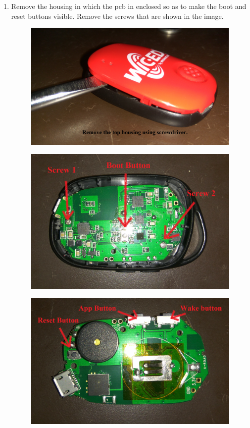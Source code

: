 \documentclass[11pt,a4paper]{article}
\begin{document}
\begin{enumerate}
	  \newpage
	  \item Remove the housing in which the pcb in enclosed so as to make the boot and reset buttons visible. Remove the screws that are shown in the image.
	  
	  \begin{figure}[h]
        \centering
    	\includegraphics[scale=0.05]{4.jpg}
	    \end{figure}
	    
	    \begin{figure}[h]
        \centering
    	\includegraphics[scale=0.08]{5.jpg}
	    \end{figure}
	    
	    
	    \begin{figure}[h]
        \centering
    	\includegraphics[scale=0.07]{6.jpg}
	    \end{figure}
	    

\end{enumerate}
\end{document}
